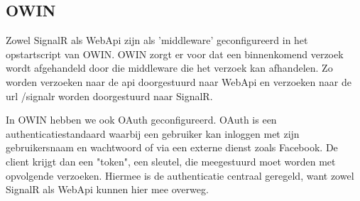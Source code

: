 \subsection{OWIN}
Zowel SignalR als WebApi zijn als 'middleware' geconfigureerd in het opstartscript van OWIN. OWIN zorgt er voor dat een binnenkomend verzoek wordt afgehandeld door die middleware die het verzoek kan afhandelen. Zo worden verzoeken naar de api doorgestuurd naar WebApi en verzoeken naar de url /signalr worden doorgestuurd naar SignalR. 

In OWIN hebben we ook OAuth geconfigureerd. OAuth is een authenticatiestandaard waarbij een gebruiker kan inloggen met zijn gebruikersnaam en wachtwoord of via een externe dienst zoals Facebook. De client krijgt dan een "token", een sleutel, die meegestuurd moet worden met opvolgende verzoeken. Hiermee is de authenticatie centraal geregeld, want zowel SignalR als WebApi kunnen hier mee overweg.